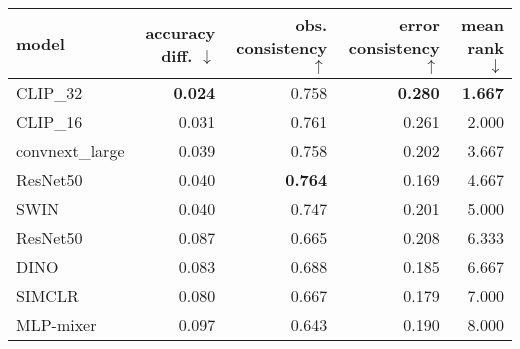 \begin{tabular}{lrrrr}
\toprule
          model & accuracy diff. $\downarrow$ & obs. consistency $\uparrow$ & error consistency $\uparrow$ & mean rank $\downarrow$ \\
\midrule
       CLIP\_32 &              \textbf{0.024} &                       0.758 &               \textbf{0.280} &         \textbf{1.667} \\
       CLIP\_16 &                       0.031 &                       0.761 &                        0.261 &                  2.000 \\
convnext\_large &                       0.039 &                       0.758 &                        0.202 &                  3.667 \\
       ResNet50 &                       0.040 &              \textbf{0.764} &                        0.169 &                  4.667 \\
           SWIN &                       0.040 &                       0.747 &                        0.201 &                  5.000 \\
       ResNet50 &                       0.087 &                       0.665 &                        0.208 &                  6.333 \\
           DINO &                       0.083 &                       0.688 &                        0.185 &                  6.667 \\
         SIMCLR &                       0.080 &                       0.667 &                        0.179 &                  7.000 \\
      MLP-mixer &                       0.097 &                       0.643 &                        0.190 &                  8.000 \\
\bottomrule
\end{tabular}

